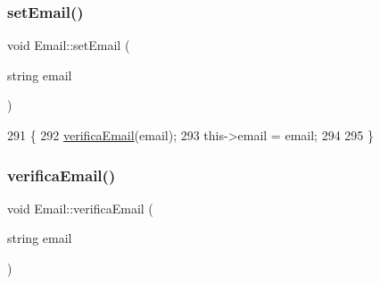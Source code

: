 \subsubsection{\texorpdfstring{set\+Email()}{setEmail()}}
{\footnotesize\ttfamily void Email\+::set\+Email (\begin{DoxyParamCaption}\item[{string}]{email }\end{DoxyParamCaption})}


\begin{DoxyCode}
291 \{
292   \mbox{\hyperlink{class_email_ab105064f3488d882a3e432052eea954e}{verificaEmail}}(email);
293   this->email = email;
294 
295 \}
\end{DoxyCode}
\mbox{\label{class_email_ab105064f3488d882a3e432052eea954e}} 
\subsubsection{\texorpdfstring{verifica\+Email()}{verificaEmail()}}
{\footnotesize\ttfamily void Email\+::verifica\+Email (\begin{DoxyParamCaption}\item[{string}]{email }\end{DoxyParamCaption})}


